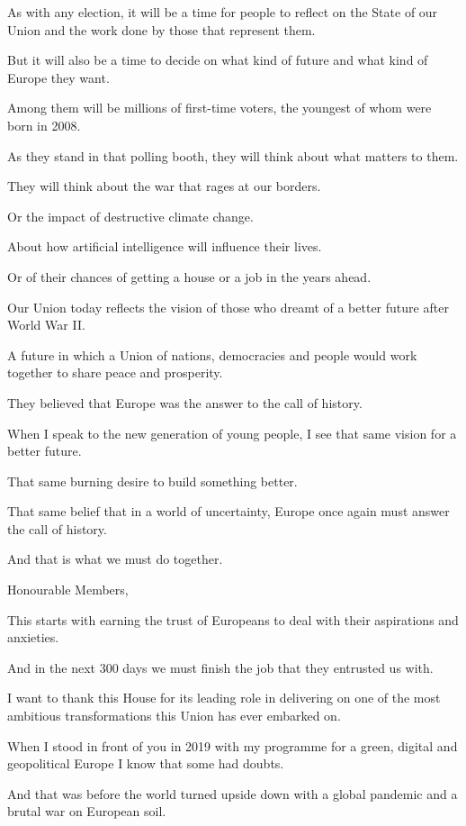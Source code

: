 \documentclass[a4paper,11pt]{article}
\begin{document}
As with any election, it will be a time for people to reflect on the State of our Union and the work done by those that represent them.

But it will also be a time to decide on what kind of future and what kind of Europe they want. 

Among them will be millions of first-time voters, the youngest of whom were born in 2008.

As they stand in that polling booth, they will think about what matters to them.

They will think about the war that rages at our borders.

Or the impact of destructive climate change.

About how artificial intelligence will influence their lives.

Or of their chances of getting a house or a job in the years ahead.

Our Union today reflects the vision of those who dreamt of a better future after World War II.  

A future in which a Union of nations, democracies and people would work together to share peace and prosperity.

They believed that Europe was the answer to the call of history. 

When I speak to the new generation of young people, I see that same vision for a better future.

That same burning desire to build something better.

That same belief that in a world of uncertainty, Europe once again must answer the call of history.

And that is what we must do together. 

 

Honourable Members,

This starts with earning the trust of Europeans to deal with their aspirations and anxieties.

And in the next 300 days we must finish the job that they entrusted us with.

I want to thank this House for its leading role in delivering on one of the most ambitious transformations this Union has ever embarked on.

When I stood in front of you in 2019 with my programme for a green, digital and geopolitical Europe I know that some had doubts.

And that was before the world turned upside down with a global pandemic and a brutal war on European soil. 
\end{document}
